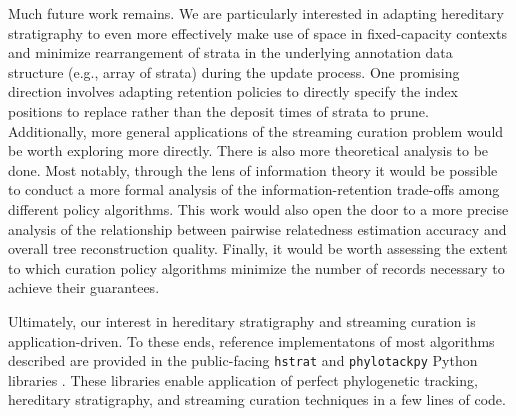 Much future work remains.
We are particularly interested in adapting hereditary stratigraphy to even more effectively make use of space in fixed-capacity contexts and minimize rearrangement of strata in the underlying annotation data structure (e.g., array of strata) during the update process.
One promising direction involves adapting retention policies to directly specify the index positions to replace rather than the deposit times of strata to prune.
Additionally, more general applications of the streaming curation problem would be worth exploring more directly.
There is also more theoretical analysis to be done.
Most notably, through the lens of information theory it would be possible to conduct a more formal analysis of the information-retention trade-offs among different policy algorithms. 
This work would also open the door to a more precise analysis of the relationship between pairwise relatedness estimation accuracy and overall tree reconstruction quality.
Finally, it would be worth assessing the extent to which curation policy algorithms minimize the number of records necessary to achieve their guarantees.

Ultimately, our interest in hereditary stratigraphy and streaming curation is application-driven.
To these ends, reference implementatons of most algorithms described are provided in the public-facing \texttt{hstrat} and \texttt{phylotackpy} Python libraries \citep{moreno2022hstrat, dolson2023phylotrackpy}.
These libraries enable application of perfect phylogenetic tracking, hereditary stratigraphy, and streaming curation techniques in a few lines of code.
